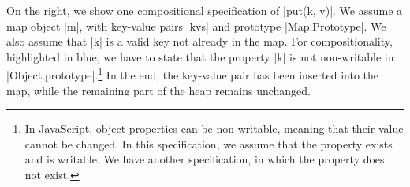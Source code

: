 On the right, we show one compositional specification of \jsinline|put(k, v)|. 
We assume a map object \jsinline|m|, with key-value pairs \jsinline|kvs| and prototype \jsinline|Map.Prototype|. We also assume that \jsinline|k| is a valid key not already in the map. For compositionality, highlighted in blue, we have to state that the property \jsinline|k| is not non-writable in \jsinline|Object.prototype|.\footnote{In JavaScript, object properties can be non-writable, meaning that their value cannot be changed. In this specification, we assume that the property exists and is writable. We have another specification, in which the property does not exist.}
In the end, the key-value pair has been inserted into the map, while the remaining part of the heap remains unchanged.


